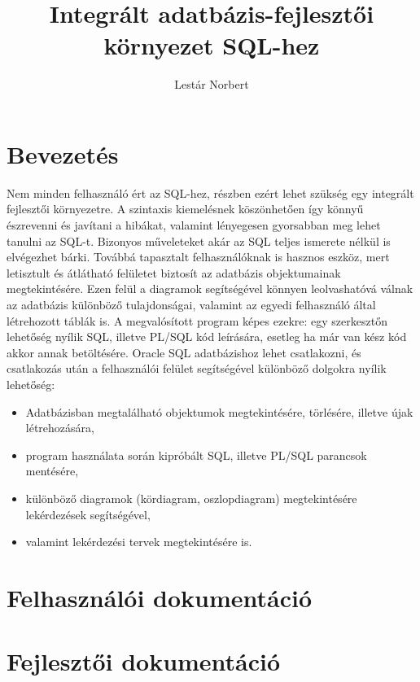 \documentclass{elteikthesis}
\title{Integrált adatbázis-fejlesztői környezet SQL-hez}
\author{Lestár Norbert}
\begin{document}
\frontmatter

	\maketitle
	\tableofcontents
	
\mainmatter

\chapter{Bevezetés} 
Nem minden felhasználó ért az SQL-hez, részben ezért lehet szükség egy integrált fejlesztői
környezetre. A szintaxis kiemelésnek köszönhetően így könnyű észrevenni és javítani a hibákat,
valamint lényegesen gyorsabban meg lehet tanulni az SQL-t. Bizonyos műveleteket akár az SQL teljes
ismerete nélkül is elvégezhet bárki. Továbbá tapasztalt felhasználóknak is hasznos eszköz, mert
letisztult és átlátható felületet biztosít az adatbázis objektumainak megtekintésére. Ezen felül a
diagramok segítségével könnyen leolvashatóvá válnak az adatbázis különböző tulajdonságai, valamint
az egyedi felhasználó által létrehozott táblák is.
A megvalósított program képes ezekre: egy szerkesztőn lehetőség nyílik SQL, illetve PL/SQL kód
leírására, esetleg ha már van kész kód akkor annak betöltésére. Oracle SQL adatbázishoz lehet
csatlakozni, és csatlakozás után a felhasználói felület segítségével különböző dolgokra nyílik lehetőség:
\begin{itemize}
  \item Adatbázisban megtalálható objektumok megtekintésére, törlésére, illetve újak létrehozására,
  \item program használata során kipróbált SQL, illetve PL/SQL parancsok mentésére,
  \item különböző diagramok (kördiagram, oszlopdiagram) megtekintésére lekérdezések segítségével,
  \item valamint lekérdezési tervek megtekintésére is.
\end{itemize}


\chapter{Felhasználói dokumentáció}

\chapter{Fejlesztői dokumentáció}
\end{document}
